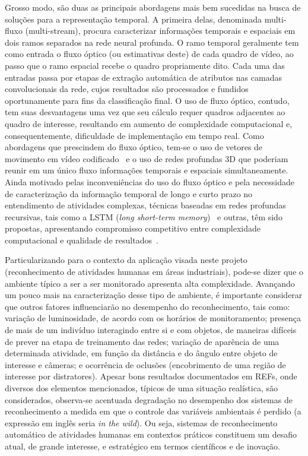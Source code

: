%
Grosso modo, são duas as principais abordagens mais bem sucedidas na busca de soluções para a representação temporal. A primeira delas, denominada multi-fluxo (multi-stream), procura caracterizar informações temporais e espaciais em dois ramos separados na rede neural profunda. O ramo temporal geralmente tem como entrada o fluxo óptico (ou estimativas deste) de cada quadro de vídeo, ao passo que o ramo espacial recebe o quadro propriamente dito. Cada uma das entradas passa por etapas de extração automática de atributos nas camadas convolucionais da rede, cujos resultados são processados e fundidos oportunamente para fins da classificação final. O uso de fluxo óptico, contudo, tem suas desvantagens uma vez que seu cálculo requer quadros adjacentes ao quadro de interesse, resultando em aumento de complexidade computacional e, consequentemente, dificuldade de implementação em tempo real. Como abordagens que prescindem do fluxo óptico, tem-se o uso de vetores de movimento em vídeo codificado~\parencite{yao-2019} e o uso de redes profundas 3D que poderiam reunir em um único fluxo informações temporais e espaciais simultaneamente. 
%
Ainda motivado pelas inconveniências do uso do fluxo óptico e pela necessidade de caracterização da informação temporal de longo e curto prazo no entendimento de atividades complexas, técnicas baseadas em redes profundas recursivas, tais como a LSTM (\emph{long short-term memory})~\parencite{hochreiter-1997} e outras, têm sido propostas, apresentando compromisso competitivo entre complexidade computacional e qualidade de resultados~\parencite{donahue-2016, herath-2017, xia-2020}.

Particularizando para o contexto da aplicação visada neste projeto (reconhecimento de atividades humanas em áreas industriais), pode-se dizer que o ambiente típico a ser a ser monitorado apresenta alta complexidade. Avançando um pouco mais na caracterização desse tipo de ambiente, é importante considerar que outros fatores influenciarão no desempenho do reconhecimento, tais como: variação de luminosidade, de acordo com os horários de monitoramento; presença de mais de um indivíduo interagindo entre si e com objetos, de maneiras difíceis de prever na etapa de treinamento das redes; variação de aparência de uma determinada atividade, em função da distância e do ângulo entre objeto de interesse e câmeras; e ocorrência de oclusões (encobrimento de uma região de interesse por distratores).
%
Apesar bons resultados documentados em REFs, onde diversos dos elementos mencionados, típicos de uma situação realística, são considerados, observa-se acentuada degradação no desempenho dos sistemas de reconhecimento a medida em que o controle das variáveis ambientais é perdido (a expressão em inglês seria \emph{in the wild}). Ou seja, sistemas de reconhecimento automático de atividades humanas em contextos práticos constituem um desafio atual, de grande interesse, e estratégico em termos científicos e de inovação.

